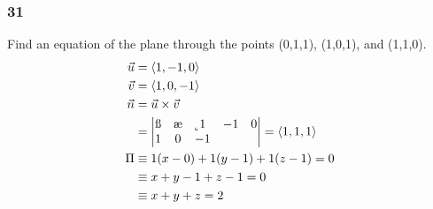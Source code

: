 \documentclass[letterpaper, 12pt]{math}
\begin{document}
\subsubsection*{31}
Find an equation of the plane through the points (0,1,1), (1,0,1), and (1,1,0).
\begin{align*}
  \vec{u} &= \langle1,-1,0\rangle \\
  \vec{v} &= \langle1,0,-1\rangle \\
  \vec{n} &= \vec{u}\times\vec{v} \\
  &= \begin{vmatrix}
    \i & \j & \k \\
    1 & -1 & 0 \\
    1 & 0 & -1
  \end{vmatrix} = \langle1,1,1\rangle \\
  \Pi &\equiv 1(x-0)+1(y-1)+1(z-1) = 0 \\
  &\equiv x+y-1+z-1 = 0 \\
  &\equiv x+y+z = 2
\end{align*}
\end{document}
